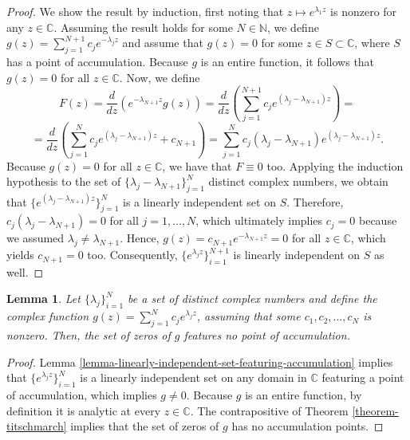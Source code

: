 \documentclass[12pt]{report} %
\newtheorem{lemma}{Lemma}
\begin{document}
\begin{proof}
  We show the result by induction, first noting that $z \mapsto e^{\lambda_1
        z}$ is nonzero for any $z \in \mathbb{C}$. Assuming the result holds for
  some $N \in \mathbb{N}$, we define $g (z) = \sum_{j = 1}^{N + 1} c_j e^{-
        \lambda_j z}$ and assume that $g (z) = 0$ for some $z \in S \subset
    \mathbb{C}$, where $S$ has a point of accumulation. Because $g$ is an entire
  function, it follows that $g (z) = 0$ for all $z \in \mathbb{C}$. Now, we
  define
  \[ F (z) = \frac{d}{d z} (e^{- \lambda_{N + 1} z} g (z)) = \frac{d}{d z}
    \left( \sum_{j = 1}^{N + 1} c_j e^{(\lambda_j - \lambda_{N + 1}) z}
    \right) = \]
  \[ = \frac{d}{d z} \left( \sum_{j = 1}^N c_j e^{(\lambda_j - \lambda_{N +
            1}) z} + c_{N + 1} \right) = \sum_{j = 1}^N c_j (\lambda_j - \lambda_{N +
      1}) e^{(\lambda_j - \lambda_{N + 1}) z} . \]
  Because $g (z) = 0$ for all $z \in \mathbb{C}$, we have that $F \equiv 0$
  too. Applying the induction hypothesis to the set of $\{ \lambda_j -
    \lambda_{N + 1} \}_{j = 1}^N$ distinct complex numbers, we obtain that $\{
    e^{(\lambda_j - \lambda_{N + 1}) z} \}_{j = 1}^N$ is a linearly independent
  set on $S$. Therefore, $c_j (\lambda_j - \lambda_{N + 1}) = 0$ for all $j =
    1, \ldots, N$, which ultimately implies $c_j = 0$ because we assumed
  $\lambda_j \neq \lambda_{N + 1}$. Hence, $g (z) = c_{N + 1} e^{- \lambda_{N
          + 1} z} = 0$ for all $z \in \mathbb{C}$, which yields $c_{N + 1} = 0$ too.
  Consequently, $\{ e^{\lambda_j z} \}_{i = 1}^{N + 1}$ is linearly
  independent on $S$ as well.
\end{proof}

\begin{lemma}
  \label{lemma-no-accumulation-point}Let $\{ \lambda_j \}_{i = 1}^N$ be a set
  of distinct complex numbers and define the complex function $g (z) = \sum_{j
      = 1}^N c_j e^{\lambda_j z}$, assuming that some $c_1, c_2, \ldots, c_N$ is
  nonzero. Then, the set of zeros of $g$ features no point of accumulation.
\end{lemma}

\begin{proof}
  Lemma \ref{lemma-linearly-independent-set-featuring-accumulation} implies
  that $\{ e^{\lambda_j z} \}_{i = 1}^N$ is a linearly independent set on any
  domain in $\mathbb{C}$ featuring a point of accumulation, which implies $g
    \neq 0$. Because $g$ is an entire function, by definition it is analytic at
  every $z \in \mathbb{C}$. The contrapositive of Theorem
  \ref{theorem-titschmarch} implies that the set of zeros of $g$ has no
  accumulation points.
\end{proof}
\end{document}
